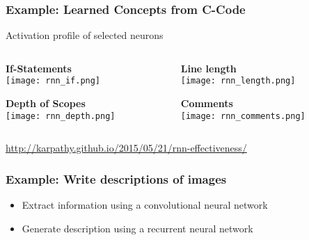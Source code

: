 \begin{frame}
  \frametitle{Example: Learned Concepts from C-Code}
    \begin{center}
    
    Activation profile of selected neurons
    \vspace{2em}
    		     
    \begin{columns}
    \begin{column}{0.5\textwidth}
	    \textbf{If-Statements}\\
        \texttt{[image: rnn\_if.png]}
        
        \vspace{2em}
        \textbf{Depth of Scopes}\\
        \texttt{[image: rnn\_depth.png]}
    \end{column}
        \begin{column}{0.5\textwidth}
    	    \textbf{Line length}\\
		    \texttt{[image: rnn\_length.png]}
		    
		     \vspace{2em}
		    \textbf{Comments}\\
	        \texttt{[image: rnn\_comments.png]}
        \end{column}
    \end{columns}

		     \vspace{2em}
        \url{http://karpathy.github.io/2015/05/21/rnn-effectiveness/}
    \end{center}
\end{frame}


\begin{frame}
  \frametitle{Example: Write descriptions of images}
    \begin{center}


      \vspace{-1em}
      \begin{itemize}
        \item Extract information using a convolutional neural network
        \item Generate description using a recurrent neural network
      \end{itemize}
    \end{center}
\end{frame}
